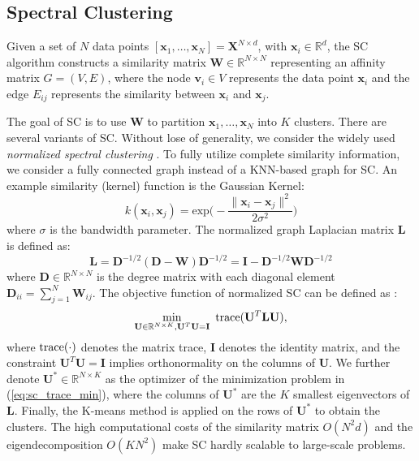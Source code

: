 \documentclass[sigconf]{acmart}
\newcommand{\R}{\mathbb{R}}
\newcommand{\1}{\boldsymbol{1}}
\newcommand{\bx}{\boldsymbol{x}}
\newcommand{\bv}{\boldsymbol{v}}
\newcommand{\bX}{\mathbf{X}}
\newcommand{\bW}{\mathbf{W}}
\newcommand{\bD}{\mathbf{D}}
\newcommand{\bL}{\mathbf{L}}
\newcommand{\bU}{\mathbf{U}}
\newcommand{\bI}{\mathbf{I}}
\newcommand{\tr}{\textnormal{trace}}
\newcommand{\0}{\boldsymbol{0}}
\begin{document}
\subsection{Spectral Clustering}
Given a set of $N$ data points $[\bx_1, \ldots, \bx_N] = \bX^{N \times d}$, with  $\bx_i \in \R^d$, the SC algorithm constructs a similarity matrix $\bW \in \R^{N \times N}$ representing an affinity matrix $G = (V,E)$, where the node $\bv_i \in V$ represents the data point $\bx_i$ and the edge $E_{ij}$ represents the similarity between  $\bx_i$ and $\bx_j$. 

The goal of SC is to use $\bW$ to partition $\bx_1, \ldots, \bx_N$ into $K$ clusters. There are several variants of SC. Without lose of generality, we consider the widely used \emph{normalized spectral clustering} \cite{ng2002spectral}. To fully utilize complete similarity information, we consider a fully connected graph instead of a KNN-based graph for SC. An example similarity (kernel) function is the Gaussian Kernel:
\begin{equation}
    k(\bx_i,\bx_j) = \text{exp}\Big(-\frac{\|\bx_i - \bx_j\|^2}{2\sigma^2}\Big)
\end{equation}
where $\sigma$ is the bandwidth parameter. The normalized graph Laplacian matrix $\bL$ is defined as: 
\begin{equation}
    \bL = \bD^{-1/2}(\bD-\bW)\bD^{-1/2} = \bI - \bD^{-1/2}\bW\bD^{-1/2}
\end{equation}
where $\bD\in\R^{N \times N}$ is the degree matrix with each diagonal element $\bD_{ii} = \sum_{j=1}^N \bW_{ij}$. The objective function of normalized SC can be defined as \cite{shi2000normalized}:
\begin{align}
\label{eq:sc_trace_min}
    \min_{\bU \in \R^{N \times K},\bU^T \bU=\bI}~\tr (\bU^T \bL \bU),
\end{align}
where $\tr(\cdot)$ denotes the matrix trace,
$\bI$ denotes the identity matrix, and the constraint $\bU^T \bU=\bI$ implies orthonormality on the columns of $\bU$. We further denote $\bU^*\in \R^{N \times K}$ as the optimizer of the minimization problem in (\ref{eq:sc_trace_min}), where the columns of $\bU^*$ are the $K$ smallest eigenvectors of $\bL$. Finally, the K-means method is applied on the rows of $\bU^*$ to obtain the clusters. The high computational costs of the similarity matrix $O(N^2d)$ and the eigendecomposition $O(KN^2)$ make SC   hardly scalable to large-scale problems. 
\end{document}
